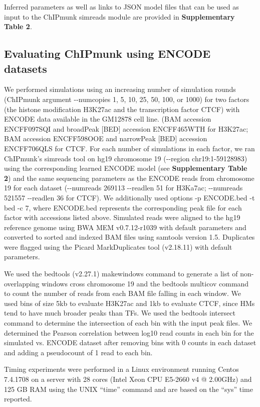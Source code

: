 \documentclass[12pt]{article}
\begin{document}
Inferred parameters as well as links to JSON model files that can be used as input to the ChIPmunk simreads module are provided in \textbf{Supplementary Table 2}.

\subsection*{Evaluating ChIPmunk using ENCODE datasets}

We performed simulations using an increasing number of simulation rounds (ChIPmunk argument -{}-numcopies 1, 5, 10, 25, 50, 100, or 1000) for two factors (the histone modification H3K27ac and the transcription factor CTCF) with ENCODE data available in the GM12878 cell line. (BAM accession ENCFF097SQI and broadPeak [BED] accession ENCFF465WTH for H3K27ac; BAM accession ENCFF598OOE and narrowPeak [BED] accession ENCFF706QLS for CTCF.
For each number of simulations in each factor, we ran ChIPmunk's simreads tool on hg19 chromosome 19 (-{}-region chr19:1-59128983) using the corresponding learned ENCODE model (see \textbf{Supplementary Table 2}) and the same sequencing parameters as the ENCODE reads from chromosome 19 for each dataset (-{}-numreads 269113 -{}-readlen 51 for H3Ka7ac; -{}-numreads 521557 -{}-readlen 36 for CTCF). 
We additionally used options -p ENCODE.bed -t bed -c 7, where ENCODE.bed represents the corresponding peak file for each factor with accessions listed above.
Simulated reads were aligned to the hg19 reference genome using BWA MEM \cite{bwamem} v0.7.12-r1039 with default parameters and converted to sorted and indexed BAM files using samtools \cite{samtools} version 1.5. Duplicates were flagged using the Picard \cite{picard} MarkDuplicates tool (v2.18.11) with default parameters.

We used the bedtools \cite{bedtools} (v2.27.1) makewindows command to generate a list of non-overlapping windows cross chromosome 19 and the bedtools multicov command to count the number of reads from each BAM file falling in each window. We used bins of size 5kb to evaluate H3K27ac and 1kb to evaluate CTCF, since HMs tend to have much broader peaks than TFs.
We used the bedtools intersect command to determine the intersection of each bin with the input peak files. We determined the Pearson correlation between log10 read counts in each bin for the simulated vs. ENCODE dataset after removing bins with 0 counts in each dataset and adding a pseudocount of 1 read to each bin.

Timing experiments were performed in a Linux environment running Centos 7.4.1708 on a server with 28 cores (Intel\textsuperscript{\textregistered} Xeon\textsuperscript{\textregistered} CPU E5-2660 v4 @ 2.00GHz) and 125 GB RAM using the UNIX ``time'' command and are based on the ``sys'' time reported. 
\end{document}
